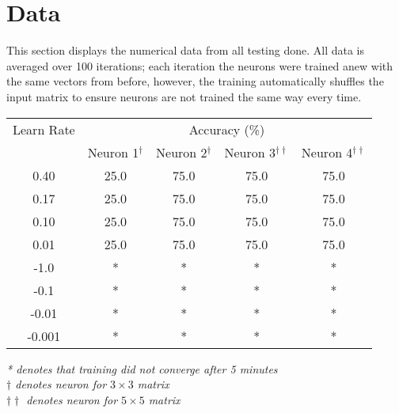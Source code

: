 \documentclass{article}
\begin{document}
\section{Data}
This section displays the numerical data from all testing done. All data is averaged over 100 iterations; each iteration the neurons were trained anew with the same vectors from before, however, the training automatically shuffles the input matrix to ensure neurons are not trained the same way every time.\\
\linebreak
\begin{minipage}{\linewidth}
	\centering
	\begin{tabular}{c|cccc}\label{T1}
		Learn Rate      & \multicolumn{4}{c}{Accuracy (\%)} \\
		& Neuron 1$^{\dagger}$ 	& Neuron 2$^{\dagger}$ 	& Neuron 3$^{\dagger\dagger}$ 	& Neuron 4$^{\dagger\dagger}$ \\
		\hline
		0.40			& 25.0		& 75.0		& 75.0		& 75.0 \\
		0.17			& 25.0		& 75.0		& 75.0		& 75.0 \\
		0.10			& 25.0		& 75.0		& 75.0		& 75.0 \\
		0.01			& 25.0		& 75.0		& 75.0		& 75.0 \\
		-1.0			& *			& *			& *			& *	   \\
		-0.1			& *			& *			& *			& *	   \\
		-0.01			& *			& *			& *			& *	   \\
		-0.001			& *			& *			& *			& *	   \\
	\end{tabular}

	\bigskip
	\small
	\textit{* denotes that training did not converge after 5 minutes\\}
	\textit{$\dagger$ denotes neuron for $3\times 3$ matrix\\}
	\textit{$\dagger\dagger$ denotes neuron for $5\times 5$ matrix\\}
\end{minipage}
\end{document}
